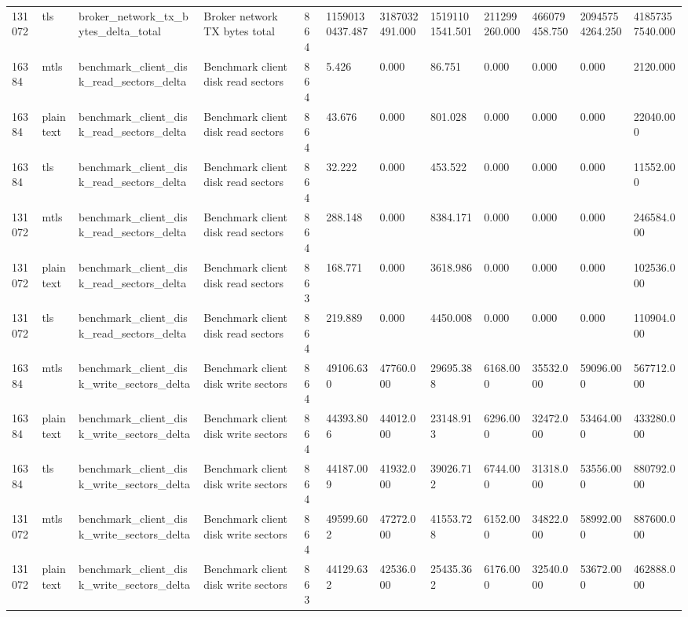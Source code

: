 \begin{longtable}{llllllllllll}
131072 & tls & broker\_network\_tx\_bytes\_delta\_total & Broker network TX bytes total & 864 & 11590130437.487 & 3187032491.000 & 15191101541.501 & 211299260.000 & 466079458.750 & 20945754264.250 & 41857357540.000 \\
16384 & mtls & benchmark\_client\_disk\_read\_sectors\_delta & Benchmark client disk read sectors & 864 & 5.426 & 0.000 & 86.751 & 0.000 & 0.000 & 0.000 & 2120.000 \\
16384 & plaintext & benchmark\_client\_disk\_read\_sectors\_delta & Benchmark client disk read sectors & 864 & 43.676 & 0.000 & 801.028 & 0.000 & 0.000 & 0.000 & 22040.000 \\
16384 & tls & benchmark\_client\_disk\_read\_sectors\_delta & Benchmark client disk read sectors & 864 & 32.222 & 0.000 & 453.522 & 0.000 & 0.000 & 0.000 & 11552.000 \\
131072 & mtls & benchmark\_client\_disk\_read\_sectors\_delta & Benchmark client disk read sectors & 864 & 288.148 & 0.000 & 8384.171 & 0.000 & 0.000 & 0.000 & 246584.000 \\
131072 & plaintext & benchmark\_client\_disk\_read\_sectors\_delta & Benchmark client disk read sectors & 863 & 168.771 & 0.000 & 3618.986 & 0.000 & 0.000 & 0.000 & 102536.000 \\
131072 & tls & benchmark\_client\_disk\_read\_sectors\_delta & Benchmark client disk read sectors & 864 & 219.889 & 0.000 & 4450.008 & 0.000 & 0.000 & 0.000 & 110904.000 \\
16384 & mtls & benchmark\_client\_disk\_write\_sectors\_delta & Benchmark client disk write sectors & 864 & 49106.630 & 47760.000 & 29695.388 & 6168.000 & 35532.000 & 59096.000 & 567712.000 \\
16384 & plaintext & benchmark\_client\_disk\_write\_sectors\_delta & Benchmark client disk write sectors & 864 & 44393.806 & 44012.000 & 23148.913 & 6296.000 & 32472.000 & 53464.000 & 433280.000 \\
16384 & tls & benchmark\_client\_disk\_write\_sectors\_delta & Benchmark client disk write sectors & 864 & 44187.009 & 41932.000 & 39026.712 & 6744.000 & 31318.000 & 53556.000 & 880792.000 \\
131072 & mtls & benchmark\_client\_disk\_write\_sectors\_delta & Benchmark client disk write sectors & 864 & 49599.602 & 47272.000 & 41553.728 & 6152.000 & 34822.000 & 58992.000 & 887600.000 \\
131072 & plaintext & benchmark\_client\_disk\_write\_sectors\_delta & Benchmark client disk write sectors & 863 & 44129.632 & 42536.000 & 25435.362 & 6176.000 & 32540.000 & 53672.000 & 462888.000 \\

\end{longtable}
